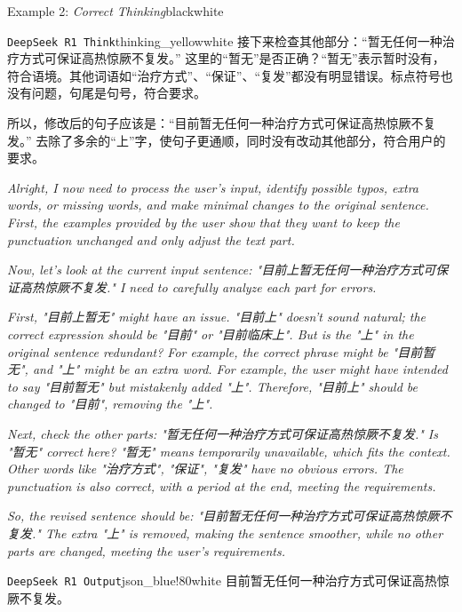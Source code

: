 \begin{figure*}[ph!]
\begin{scopebox}{Example 2: \textit{Correct Thinking}}{black}{white}
\begin{scopebox}{\texttt{DeepSeek\,R1 Think}}{thinking_yellow}{white}
            \qquad{}接下来检查其他部分：“暂无任何一种治疗方式可保证高热惊厥不复发。” 这里的“暂无”是否正确？“暂无”表示暂时没有，符合语境。其他词语如“治疗方式”、“保证”、“复发”都没有明显错误。标点符号也没有问题，句尾是句号，符合要求。\return

            \qquad{}所以，修改后的句子应该是：“目前暂无任何一种治疗方式可保证高热惊厥不复发。” 去除了多余的“上”字，使句子更通顺，同时没有改动其他部分，符合用户的要求。\return

            \tcblower
            \qquad{}\textit{Alright, I now need to process the user's input, identify possible typos, extra words, or missing words, and make minimal changes to the original sentence. First, the examples provided by the user show that they want to keep the punctuation unchanged and only adjust the text part.}\return

            \qquad{}\textit{Now, let's look at the current input sentence: "目前上暂无任何一种治疗方式可保证高热惊厥不复发." I need to carefully analyze each part for errors.}\return

            \qquad{}\textit{First, "目前上暂无" might have an issue. "目前上" doesn't sound natural; the correct expression should be "目前" or "目前临床上". But is the "上" in the original sentence redundant? For example, the correct phrase might be "目前暂无", and "上" might be an extra word. For example, the user might have intended to say "目前暂无" but mistakenly added "上". Therefore, "目前上" should be changed to "目前", removing the "上".}\return

            \qquad{}\textit{Next, check the other parts: "暂无任何一种治疗方式可保证高热惊厥不复发." Is "暂无" correct here? "暂无" means temporarily unavailable, which fits the context. Other words like "治疗方式", "保证", "复发" have no obvious errors. The punctuation is also correct, with a period at the end, meeting the requirements.}\return

            \qquad{}\textit{So, the revised sentence should be: "目前暂无任何一种治疗方式可保证高热惊厥不复发." The extra "上" is removed, making the sentence smoother, while no other parts are changed, meeting the user's requirements.}\return
        \end{scopebox}
        \begin{scopebox}{\texttt{DeepSeek\,R1 Output}}{json_blue!80}{white}
            目前暂无任何一种治疗方式可保证高热惊厥不复发。
        \end{scopebox}
    \end{scopebox}
    \caption{
        Another example of {Correct Thinking}
    }
    \label{fig:thinking_example_2}
\end{figure*}

